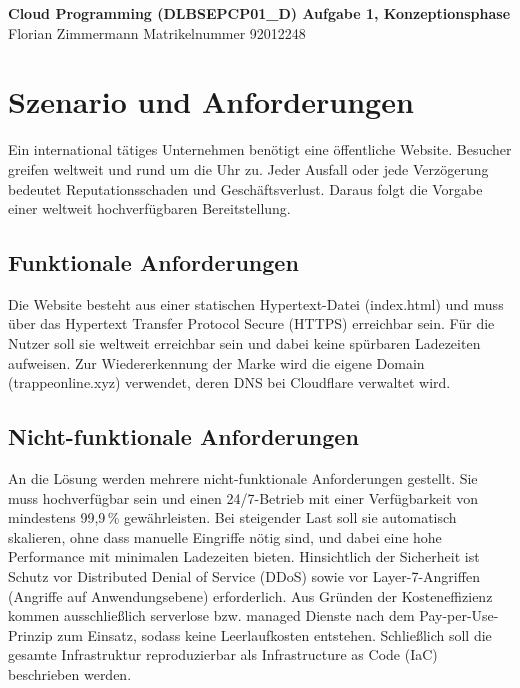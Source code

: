 \documentclass[11pt,a4paper]{article}
\begin{document}
\pagestyle{empty}

\begin{center}
{\Large\bfseries Cloud Programming (DLBSEPCP01\_D)  Aufgabe 1, Konzeptionsphase}\\[4pt]
{\small Florian Zimmermann \quad\textbar\quad Matrikelnummer 92012248}
\end{center}

\vspace{2pt}

\section{Szenario und Anforderungen}

Ein international tätiges Unternehmen benötigt eine öffentliche Website.
Besucher greifen weltweit und rund um die Uhr zu. Jeder Ausfall oder jede Verzögerung
bedeutet Reputationsschaden und Geschäftsverlust. Daraus folgt die Vorgabe einer weltweit
hochverfügbaren Bereitstellung.

\subsection{Funktionale Anforderungen}
Die Website besteht aus einer statischen Hypertext-Datei (index.html) und muss über das
Hypertext Transfer Protocol Secure (HTTPS) erreichbar sein. Für die Nutzer soll sie weltweit
erreichbar sein und dabei keine spürbaren Ladezeiten aufweisen. Zur Wiedererkennung der
Marke wird die eigene Domain (trappeonline.xyz) verwendet, deren DNS bei Cloudflare
verwaltet wird.

\subsection{Nicht-funktionale Anforderungen}
An die Lösung werden mehrere nicht-funktionale Anforderungen gestellt. Sie muss
hochverfügbar sein und einen 24/7-Betrieb mit einer Verfügbarkeit von mindestens
99,9\,\% gewährleisten. Bei steigender Last soll sie automatisch skalieren, ohne dass
manuelle Eingriffe nötig sind, und dabei eine hohe Performance mit minimalen
Ladezeiten bieten. Hinsichtlich der Sicherheit ist Schutz vor Distributed Denial of
Service (DDoS) sowie vor Layer-7-Angriffen (Angriffe auf Anwendungsebene) erforderlich. Aus
Gründen der Kosteneffizienz kommen ausschließlich serverlose bzw. managed Dienste nach
dem Pay-per-Use-Prinzip zum Einsatz, sodass keine Leerlaufkosten entstehen. Schließlich soll die
gesamte Infrastruktur reproduzierbar als Infrastructure as Code (IaC) beschrieben werden.
\end{document}
